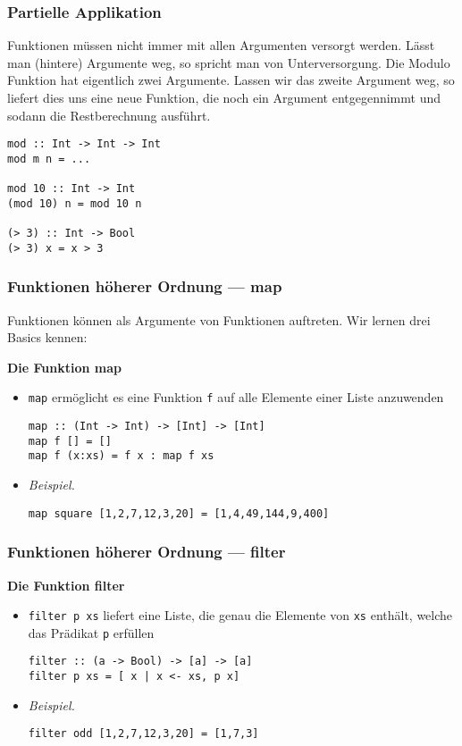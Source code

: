 \documentclass{beamer}
\begin{document}
\begin{frame}[fragile] \frametitle{Partielle Applikation}
	Funktionen müssen nicht immer mit allen Argumenten versorgt werden. Lässt man (hintere) Argumente weg, so spricht man von Unterversorgung.
	Die Modulo Funktion hat eigentlich zwei Argumente. Lassen wir das zweite Argument weg, so liefert dies uns eine neue Funktion, die noch ein Argument entgegennimmt und sodann die Restberechnung ausführt.
	\begin{lstlisting}
mod :: Int -> Int -> Int
mod m n = ...

mod 10 :: Int -> Int
(mod 10) n = mod 10 n

(> 3) :: Int -> Bool
(> 3) x = x > 3
	\end{lstlisting}
\end{frame}

\begin{frame}[fragile] \frametitle{Funktionen höherer Ordnung --- map}
	Funktionen können als Argumente von Funktionen auftreten. Wir lernen drei Basics kennen: \pause
	
	\textbf{Die Funktion map}
	\begin{itemize}
		\item \texttt{map} ermöglicht es eine Funktion \texttt{f} auf alle Elemente einer Liste anzuwenden \\ 
		\begin{lstlisting}
map :: (Int -> Int) -> [Int] -> [Int] 
map f [] = [] 
map f (x:xs) = f x : map f xs
		\end{lstlisting}
		\item \textit{Beispiel.} \\
		\begin{lstlisting}
map square [1,2,7,12,3,20] = [1,4,49,144,9,400]
		\end{lstlisting}
	\end{itemize}
\end{frame}

\begin{frame}[fragile] \frametitle{Funktionen höherer Ordnung --- filter}
	\textbf{Die Funktion filter}
	\begin{itemize}
		\item \texttt{filter p xs} liefert eine Liste, die genau die Elemente von \texttt{xs} enthält, welche das Prädikat \texttt{p} erfüllen \\
		\begin{lstlisting}
filter :: (a -> Bool) -> [a] -> [a] 
filter p xs = [ x | x <- xs, p x]
		\end{lstlisting}
		\item \textit{Beispiel.} \\
		\begin{lstlisting}
filter odd [1,2,7,12,3,20] = [1,7,3]
		\end{lstlisting}
	\end{itemize}
\end{frame}
\end{document}

